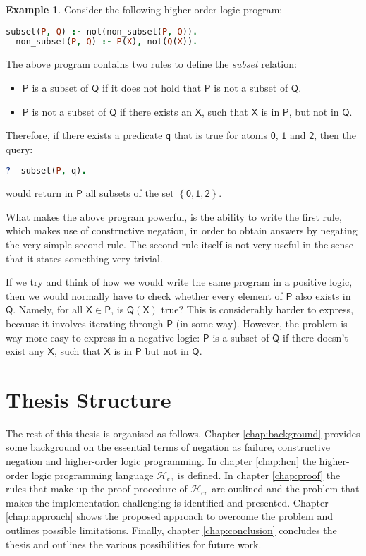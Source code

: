 \documentclass[inscr,ack,preface]{dithesis}
\theoremstyle{definition}
\newtheorem{example}{Example}[chapter]
\newcommand{\hcn}{$\mathcal{H}_\mathsf{cn}$}
\newcommand{\msf}[1]{$\mathsf{#1}$}
\begin{document}
\begin{example}\label{ex:subset}
Consider the following higher-order logic program:
\begin{lstlisting}[language=Prolog,frame=single]
  subset(P, Q) :- not(non_subset(P, Q)).
  non_subset(P, Q) :- P(X), not(Q(X)).
\end{lstlisting}
The above program contains two rules to define the \emph{subset} relation:
\begin{itemize}
  \item \msf{P} is a subset of \msf{Q} if it does not hold that \msf{P} is not a subset of \msf{Q}.
  \item \msf{P} is not a subset of \msf{Q} if there exists an \msf{X}, such that \msf{X} is in \msf{P}, but not in \msf{Q}.
\end{itemize}
Therefore, if there exists a predicate \msf{q} that is true for atoms \msf{0}, \msf{1} and \msf{2}, then the query:
\begin{lstlisting}[language=Prolog,frame=single]
  ?- subset(P, q).
\end{lstlisting}
would return in \msf{P} all subsets of the set \msf{\left\{ 0, 1, 2 \right\}}.

What makes the above program powerful, is the ability to write the first rule, which makes use of constructive negation, in order to obtain answers by negating the very simple second rule. The second rule itself is not very useful in the sense that it states something very trivial.

If we try and think of how we would write the same program in a positive logic, then we would normally have to check whether every element of \msf{P} also exists in \msf{Q}. Namely, for all \msf{X \in P}, is \msf{Q(X)} true? This is considerably harder to express, because it involves iterating through \msf{P} (in some way). However, the problem is way more easy to express in a negative logic: \msf{P} is a subset of \msf{Q} if there doesn't exist any \msf{X}, such that \msf{X} is in \msf{P} but not in \msf{Q}.

\end{example}

\section{Thesis Structure}
The rest of this thesis is organised as follows. Chapter \ref{chap:background} provides some background on the essential terms of negation as failure, constructive negation and higher-order logic programming. In chapter \ref{chap:hcn} the higher-order logic programming language \hcn{} is defined. In chapter \ref{chap:proof} the rules that make up the proof procedure of \hcn{} are outlined and the problem that makes the implementation challenging is identified and presented. Chapter \ref{chap:approach} shows the proposed approach to overcome the problem and outlines possible limitations. Finally, chapter \ref{chap:conclusion} concludes the thesis and outlines the various possibilities for future work.
\end{document}
